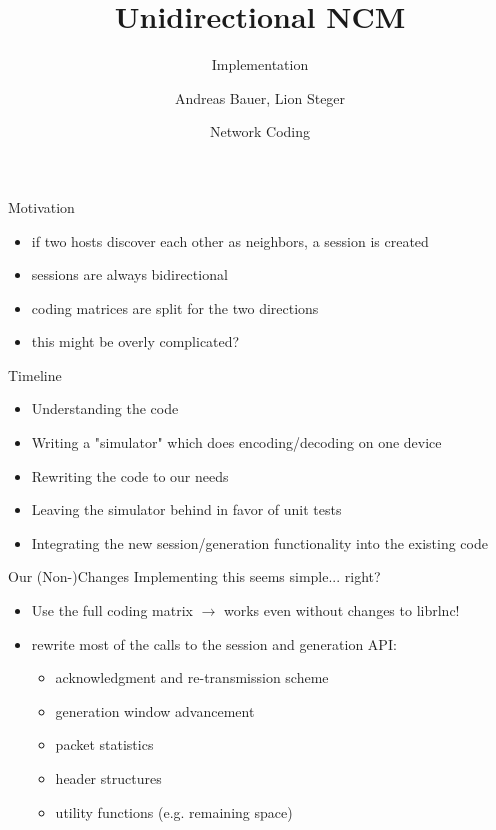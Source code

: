 \documentclass[11pt]{beamer}
\title[Short version]{Unidirectional NCM}
\subtitle[short version]{Implementation}
\date[2021]{Network Coding}
\author[Andreas Bauer, Lion Steger]{Andreas Bauer, Lion Steger}
\institute[Technische Universität München]{Technische Universität München}
\begin{document}
	\frame{\maketitle}
	
	\begin{frame}{Motivation}
		\begin{itemize}
			\item if two hosts discover each other as neighbors, a session is created
			\item sessions are always bidirectional
			\item coding matrices are split for the two directions
			\item this might be overly complicated?
		\end{itemize}
	\end{frame}

	\begin{frame}{Timeline}
		\begin{itemize}
			\item Understanding the code
			\item Writing a "simulator" which does encoding/decoding on one device
			\item Rewriting the code to our needs
			\item Leaving the simulator behind in favor of unit tests
			\item Integrating the new session/generation functionality into the existing code
		\end{itemize}
	\end{frame}

	\begin{frame}{Our (Non-)Changes}
		Implementing this seems simple... right?
		\begin{itemize}
			\item Use the full coding matrix $\rightarrow$ works even without changes to librlnc!
			\item rewrite most of the calls to the session and generation API:
			\begin{itemize}
				\item acknowledgment and re-transmission scheme
				\item generation window advancement
				\item packet statistics
				\item header structures
				\item utility functions (e.g. remaining space)
			\end{itemize}
		\end{itemize}
	\end{frame}
\end{document}
